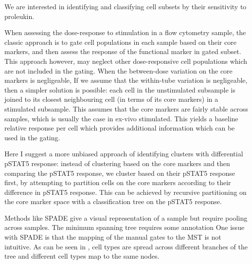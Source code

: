 
We are interested in identifying and classifying cell subsets by their sensitivity to proleukin.

When assessing the dose-response to stimulation in a flow cytometry sample,
the classic approach is to gate cell populations in each sample based on their core markers,
and then assess the response of the functional marker in gated subset.
This approach however, may neglect other dose-responsive cell populations which are not included in the gating.
When the between-dose variation on the core markers is negligeable,
If we assume that the within-tube variation is negligeable, then a simpler solution is possible:
each cell in the unstimulated subsample is joined to its closest neighbouring cell (in terms of its core markers) in a stimulated subsample.
This assumes that the core markers are fairly stable across samples, which is usually the case in ex-vivo stimulated.
This yields a baseline relative response per cell which provides additional information which can be used in the gating.

Here I suggest a more unbiased approach of identifying clusters with differential pSTAT5 response:
instead of clustering based on the core markers and then comparing the pSTAT5 response, we cluster based on their pSTAT5 response first,
by attempting to partition cells on the core markers according to their difference in pSTAT5 response.
This can be achieved by recursive partitioning on the core marker space with a classification tree on the pSTAT5 response.


Methods like SPADE give a visual representation of a sample but require pooling across samples.
The minimum spanning tree requires some annotation
One issue with SPADE is that the mapping of the manual gates to the MST is not intuitive.
As can be seen in , cell types are spread across different branches of the tree and different cell types map to the same nodes.

